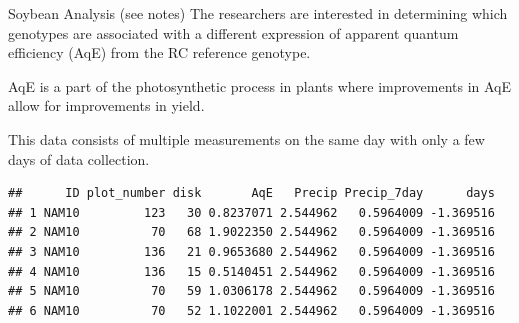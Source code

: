 \documentclass[
  ignorenonframetext,
]{beamer}
\newenvironment{Shaded}{\begin{snugshade}}{\end{snugshade}}
\newcommand{\FunctionTok}[1]{\textcolor[rgb]{0.00,0.00,0.00}{#1}}
\newcommand{\NormalTok}[1]{#1}
\newcommand{\OtherTok}[1]{\textcolor[rgb]{0.56,0.35,0.01}{#1}}
\newcommand{\SpecialCharTok}[1]{\textcolor[rgb]{0.00,0.00,0.00}{#1}}
\newcommand{\StringTok}[1]{\textcolor[rgb]{0.31,0.60,0.02}{#1}}
\begin{document}
\begin{frame}[fragile]{Soybean Analysis (see notes)}
\protect\hypertarget{soybean-analysis-see-notes}{}
The researchers are interested in determining which genotypes are
associated with a different expression of apparent quantum efficiency
(AqE) from the RC reference genotype.

AqE is a part of the photosynthetic process in plants where improvements
in AqE allow for improvements in yield.

This data consists of multiple measurements on the same day with only a
few days of data collection.

\vspace{12pt}
\tiny

\begin{Shaded}
\end{Shaded}

\begin{verbatim}
##      ID plot_number disk       AqE   Precip Precip_7day      days
## 1 NAM10         123   30 0.8237071 2.544962   0.5964009 -1.369516
## 2 NAM10          70   68 1.9022350 2.544962   0.5964009 -1.369516
## 3 NAM10         136   21 0.9653680 2.544962   0.5964009 -1.369516
## 4 NAM10         136   15 0.5140451 2.544962   0.5964009 -1.369516
## 5 NAM10          70   59 1.0306178 2.544962   0.5964009 -1.369516
## 6 NAM10          70   52 1.1022001 2.544962   0.5964009 -1.369516
\end{verbatim}
\end{frame}
\end{document}
